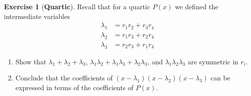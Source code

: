 \documentclass[reqno, 12pt, letter]{article}
\theoremstyle{plain}
\theoremstyle{definition}
\newtheorem{exercise}[theorem]{Exercise}
\theoremstyle{remark}
\numberwithin{equation}{section}
\begin{document}
	\begin{exercise}[\textbf{Quartic}]
		\label{exercise:quartic-lambda}
		Recall that for a quartic $ P(x)$ we defined the intermediate variables
		\begin{align*}
				\lambda_1 &= r_1 r_2 + r_3 r_4 \\
				\lambda_2 &= r_1 r_3 + r_2 r_4 \\
				\lambda_3 &= r_2 r_3 + r_1 r_4 
		\end{align*}
			\begin{enumerate}
			\item Show that $ \lambda_1 + \lambda_2 + \lambda_3$, $ \lambda_1 \lambda_2 + \lambda_1 \lambda_3 + \lambda_2 \lambda_3$, and $ \lambda_1 \lambda_2 \lambda_3$ are symmetric in $r_i$. 
			\item Conclude that the coefficients of $ (x-\lambda_1)(x-\lambda_2)(x-\lambda_3)$ can be expressed in terms of the coefficients of $ P(x)$.
		\end{enumerate}
	\end{exercise}
	
\end{document}
